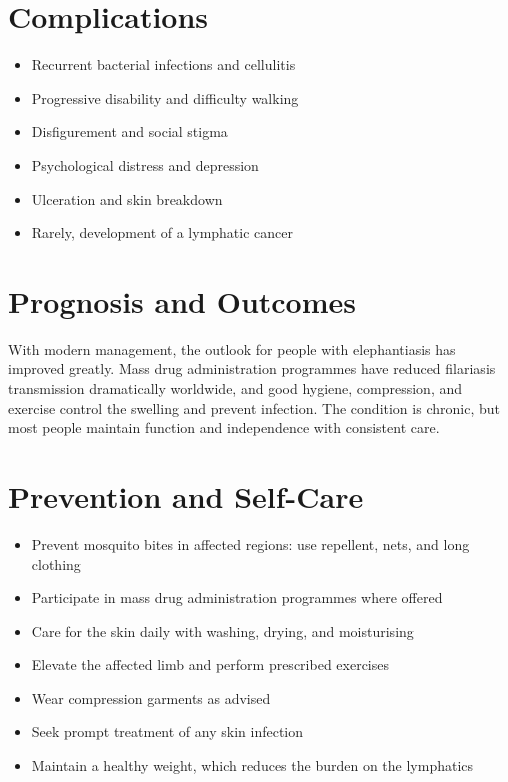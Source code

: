 \section*{Complications}
\begin{itemize}
    \item Recurrent bacterial infections and cellulitis
    \item Progressive disability and difficulty walking
    \item Disfigurement and social stigma
    \item Psychological distress and depression
    \item Ulceration and skin breakdown
    \item Rarely, development of a lymphatic cancer
\end{itemize}

\section*{Prognosis and Outcomes}
With modern management, the outlook for people with elephantiasis has improved greatly. Mass drug administration programmes have reduced filariasis transmission dramatically worldwide, and good hygiene, compression, and exercise control the swelling and prevent infection. The condition is chronic, but most people maintain function and independence with consistent care.

\section*{Prevention and Self-Care}
\begin{itemize}
    \item Prevent mosquito bites in affected regions: use repellent, nets, and long clothing
    \item Participate in mass drug administration programmes where offered
    \item Care for the skin daily with washing, drying, and moisturising
    \item Elevate the affected limb and perform prescribed exercises
    \item Wear compression garments as advised
    \item Seek prompt treatment of any skin infection
    \item Maintain a healthy weight, which reduces the burden on the lymphatics
\end{itemize}

